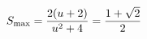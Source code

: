 \documentclass[preview]{standalone}
\begin{document}
\begin{align*}
\special{dvisvgm:raw <g id='unique000'>}S_{\max}=\frac{2(u+2)}{u^2+4}=\frac{1+\sqrt2}{2}\special{dvisvgm:raw </g>}
\end{align*}
\end{document}
